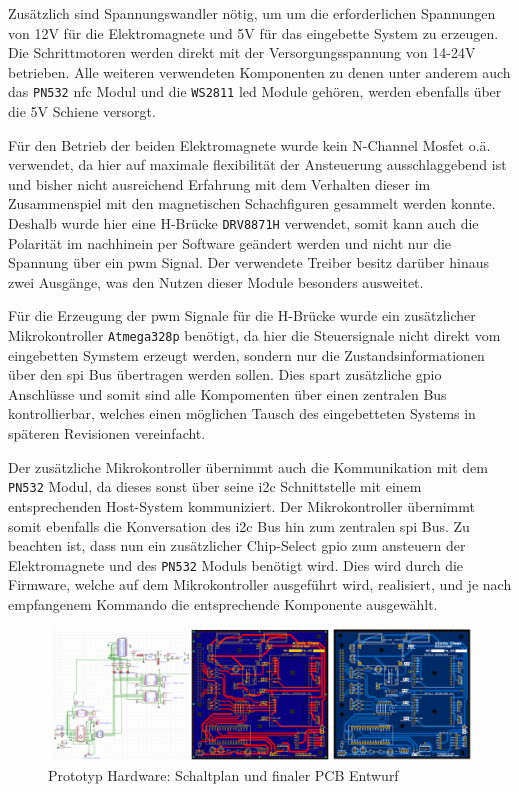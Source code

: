 Zusätzlich sind Spannungswandler nötig, um um die erforderlichen
Spannungen von 12V für die Elektromagnete und 5V für das eingebette
System zu erzeugen. Die Schrittmotoren werden direkt mit der
Versorgungsspannung von 14-24V betrieben. Alle weiteren verwendeten
Komponenten zu denen unter anderem auch das
\passthrough{\lstinline!PN532!} \gls{nfc} Modul und die
\passthrough{\lstinline!WS2811!} \gls{led} Module gehören, werden
ebenfalls über die 5V Schiene versorgt.

Für den Betrieb der beiden Elektromagnete wurde kein N-Channel Mosfet
o.ä. verwendet, da hier auf maximale flexibilität der Ansteuerung
ausschlaggebend ist und bisher nicht ausreichend Erfahrung mit dem
Verhalten dieser im Zusammenspiel mit den magnetischen Schachfiguren
gesammelt werden konnte. Deshalb wurde hier eine H-Brücke
\passthrough{\lstinline!DRV8871H!} verwendet, somit kann auch die
Polarität im nachhinein per Software geändert werden und nicht nur die
Spannung über ein \gls{pwm} Signal. Der verwendete Treiber besitz
darüber hinaus zwei Ausgänge, was den Nutzen dieser Module besonders
ausweitet.

Für die Erzeugung der \gls{pwm} Signale für die H-Brücke wurde ein
zusätzlicher Mikrokontroller \passthrough{\lstinline!Atmega328p!}
benötigt, da hier die Steuersignale nicht direkt vom eingebetten Symstem
erzeugt werden, sondern nur die Zustandsinformationen über den \gls{spi}
Bus übertragen werden sollen. Dies spart zusätzliche \gls{gpio}
Anschlüsse und somit sind alle Kompomenten über einen zentralen Bus
kontrollierbar, welches einen möglichen Tausch des eingebetteten Systems
in späteren Revisionen vereinfacht.

Der zusätzliche Mikrokontroller übernimmt auch die Kommunikation mit dem
\passthrough{\lstinline!PN532!} Modul, da dieses sonst über seine
\gls{i2c} Schnittstelle mit einem entsprechenden Host-System
kommuniziert. Der Mikrokontroller übernimmt somit ebenfalls die
Konversation des \gls{i2c} Bus hin zum zentralen \gls{spi} Bus. Zu
beachten ist, dass nun ein zusätzlicher Chip-Select \gls{gpio} zum
ansteuern der Elektromagnete und des \passthrough{\lstinline!PN532!}
Moduls benötigt wird. Dies wird durch die Firmware, welche auf dem
Mikrokontroller ausgeführt wird, realisiert, und je nach empfangenem
Kommando die entsprechende Komponente ausgewählt.

\begin{figure}
\centering
\includegraphics{images/ATC_DK_HW_SCHEM.png}
\caption{Prototyp Hardware: Schaltplan und finaler PCB Entwurf
\label{ATC_Schematic_DK}}
\end{figure}

